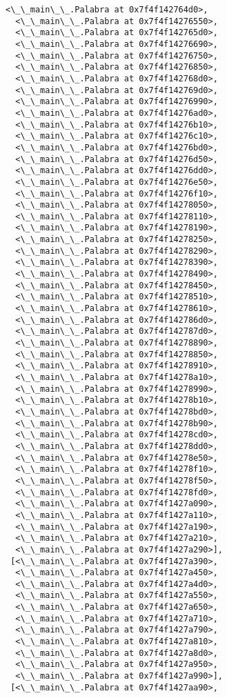 \documentclass[12pt,a4paper,table]{article}
\begin{document}
\begin{tcolorbox}[breakable, size=fbox, boxrule=.5pt, pad at break*=1mm, opacityfill=0]
\begin{Verbatim}[commandchars=\\\{\}]
  <\_\_main\_\_.Palabra at 0x7f4f142764d0>,
  <\_\_main\_\_.Palabra at 0x7f4f14276550>,
  <\_\_main\_\_.Palabra at 0x7f4f142765d0>,
  <\_\_main\_\_.Palabra at 0x7f4f14276690>,
  <\_\_main\_\_.Palabra at 0x7f4f14276750>,
  <\_\_main\_\_.Palabra at 0x7f4f14276850>,
  <\_\_main\_\_.Palabra at 0x7f4f142768d0>,
  <\_\_main\_\_.Palabra at 0x7f4f142769d0>,
  <\_\_main\_\_.Palabra at 0x7f4f14276990>,
  <\_\_main\_\_.Palabra at 0x7f4f14276ad0>,
  <\_\_main\_\_.Palabra at 0x7f4f14276b10>,
  <\_\_main\_\_.Palabra at 0x7f4f14276c10>,
  <\_\_main\_\_.Palabra at 0x7f4f14276bd0>,
  <\_\_main\_\_.Palabra at 0x7f4f14276d50>,
  <\_\_main\_\_.Palabra at 0x7f4f14276dd0>,
  <\_\_main\_\_.Palabra at 0x7f4f14276e50>,
  <\_\_main\_\_.Palabra at 0x7f4f14276f10>,
  <\_\_main\_\_.Palabra at 0x7f4f14278050>,
  <\_\_main\_\_.Palabra at 0x7f4f14278110>,
  <\_\_main\_\_.Palabra at 0x7f4f14278190>,
  <\_\_main\_\_.Palabra at 0x7f4f14278250>,
  <\_\_main\_\_.Palabra at 0x7f4f14278290>,
  <\_\_main\_\_.Palabra at 0x7f4f14278390>,
  <\_\_main\_\_.Palabra at 0x7f4f14278490>,
  <\_\_main\_\_.Palabra at 0x7f4f14278450>,
  <\_\_main\_\_.Palabra at 0x7f4f14278510>,
  <\_\_main\_\_.Palabra at 0x7f4f14278610>,
  <\_\_main\_\_.Palabra at 0x7f4f142786d0>,
  <\_\_main\_\_.Palabra at 0x7f4f142787d0>,
  <\_\_main\_\_.Palabra at 0x7f4f14278890>,
  <\_\_main\_\_.Palabra at 0x7f4f14278850>,
  <\_\_main\_\_.Palabra at 0x7f4f14278910>,
  <\_\_main\_\_.Palabra at 0x7f4f14278a10>,
  <\_\_main\_\_.Palabra at 0x7f4f14278990>,
  <\_\_main\_\_.Palabra at 0x7f4f14278b10>,
  <\_\_main\_\_.Palabra at 0x7f4f14278bd0>,
  <\_\_main\_\_.Palabra at 0x7f4f14278b90>,
  <\_\_main\_\_.Palabra at 0x7f4f14278cd0>,
  <\_\_main\_\_.Palabra at 0x7f4f14278dd0>,
  <\_\_main\_\_.Palabra at 0x7f4f14278e50>,
  <\_\_main\_\_.Palabra at 0x7f4f14278f10>,
  <\_\_main\_\_.Palabra at 0x7f4f14278f50>,
  <\_\_main\_\_.Palabra at 0x7f4f14278fd0>,
  <\_\_main\_\_.Palabra at 0x7f4f1427a090>,
  <\_\_main\_\_.Palabra at 0x7f4f1427a110>,
  <\_\_main\_\_.Palabra at 0x7f4f1427a190>,
  <\_\_main\_\_.Palabra at 0x7f4f1427a210>,
  <\_\_main\_\_.Palabra at 0x7f4f1427a290>],
 [<\_\_main\_\_.Palabra at 0x7f4f1427a390>,
  <\_\_main\_\_.Palabra at 0x7f4f1427a450>,
  <\_\_main\_\_.Palabra at 0x7f4f1427a4d0>,
  <\_\_main\_\_.Palabra at 0x7f4f1427a550>,
  <\_\_main\_\_.Palabra at 0x7f4f1427a650>,
  <\_\_main\_\_.Palabra at 0x7f4f1427a710>,
  <\_\_main\_\_.Palabra at 0x7f4f1427a790>,
  <\_\_main\_\_.Palabra at 0x7f4f1427a810>,
  <\_\_main\_\_.Palabra at 0x7f4f1427a8d0>,
  <\_\_main\_\_.Palabra at 0x7f4f1427a950>,
  <\_\_main\_\_.Palabra at 0x7f4f1427a990>],
 [<\_\_main\_\_.Palabra at 0x7f4f1427aa90>,

\end{Verbatim}
\end{tcolorbox}
\end{document}

